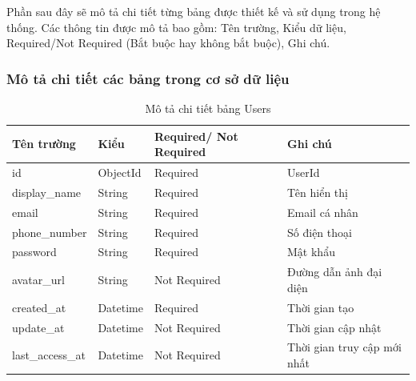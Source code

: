 \documentclass[../DoAn.tex]{subfiles}
\begin{document}
Phần sau đây sẽ mô tả chi tiết từng bảng được thiết kế và sử dụng trong hệ thống. Các thông tin được mô tả bao gồm: Tên trường, Kiểu dữ liệu, Required/Not Required (Bắt buộc hay không bắt buộc), Ghi chú.
\subsubsection{Mô tả chi tiết các bảng trong cơ sở dữ liệu}
\begin{table}[H]
\centering
\begin{tabular}{|p{2.7cm}|l|p{2.5cm}|p{4cm}|}
\hline
Tên trường       & Kiểu     & Required/   Not Required & Ghi chú                       \\ \hline
id               & ObjectId & Required                 & UserId                        \\ \hline
display\_name    & String   & Required                 & Tên hiển thị                  \\ \hline
email            & String   & Required                 & Email cá nhân                 \\ \hline
phone\_number    & String   & Required                 & Số điện thoại                 \\ \hline
password         & String   & Required                 & Mật khẩu                      \\ \hline
avatar\_url      & String   & Not Required             & Đường dẫn ảnh   đại diện      \\ \hline
created\_at      & Datetime & Required                 & Thời gian tạo                 \\ \hline
update\_at       & Datetime & Not Required             & Thời gian cập   nhật          \\ \hline
last\_access\_at & Datetime & Not Required             & Thời gian truy   cập mới nhất \\ \hline
\end{tabular}
\caption{Mô tả chi tiết bảng Users}
\label{tab:my-table}
\end{table}
\newpage
\end{document}
